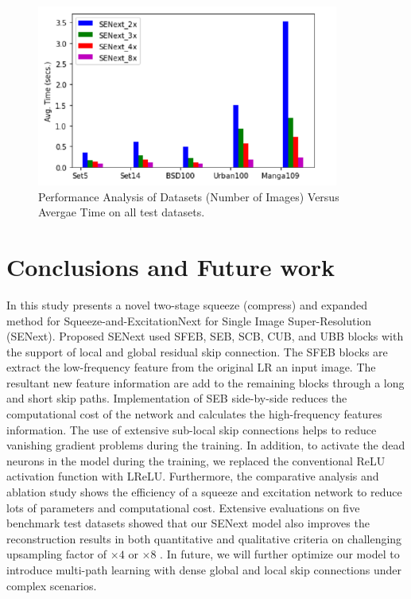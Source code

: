 \documentclass{ieeeaccess}
\begin{document}
\begin{figure}[ht]
  \includegraphics[width=\linewidth]{21FIGURE.pdf}
  \caption{Performance Analysis of Datasets (Number of Images) Versus Avergae Time on all test datasets.}
  \label{fig:21}
\end{figure}




\section{Conclusions and Future work}
In this study presents a novel two-stage squeeze (compress) and expanded method for Squeeze-and-ExcitationNext for Single Image Super-Resolution (SENext). Proposed SENext used SFEB, SEB, SCB, CUB, and UBB blocks with the support of local and global residual skip connection. The SFEB blocks are extract the low-frequency feature from the original LR an input image. The resultant new feature information are add to the remaining blocks through a long
and short skip paths. Implementation of SEB side-by-side reduces the computational cost of the network and calculates the high-frequency features information.
 The use of extensive sub-local skip connections helps to reduce vanishing gradient problems during the training. In addition, to activate the dead neurons in the model during the training, we replaced the conventional ReLU activation function with LReLU. Furthermore, the comparative analysis and ablation study shows the efficiency of a squeeze and excitation network to reduce lots of parameters and computational cost. Extensive evaluations on five benchmark test datasets showed that our SENext model also improves the reconstruction results in both quantitative and qualitative criteria on challenging upsampling factor of $\times 4$ or $\times 8$ . In future, we will further optimize our model to introduce multi-path learning with dense global and local skip connections under complex scenarios.
\end{document}
